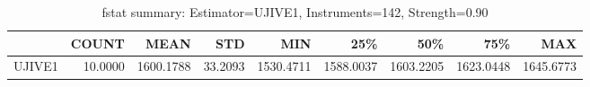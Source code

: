 \begin{table}[ht]
\centering
\caption{fstat summary: Estimator=UJIVE1, Instruments=142, Strength=0.90}
\begin{tabular}{lrrrrrrrr}
\toprule
 & COUNT & MEAN & STD & MIN & 25\% & 50\% & 75\% & MAX \\
\midrule
UJIVE1 & 10.0000 & 1600.1788 & 33.2093 & 1530.4711 & 1588.0037 & 1603.2205 & 1623.0448 & 1645.6773 \\
\bottomrule
\end{tabular}
\end{table}
